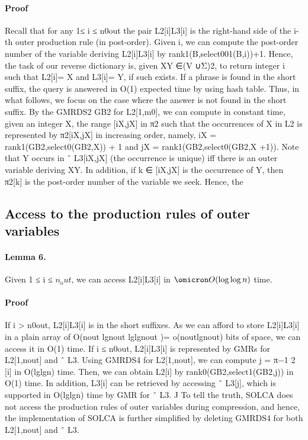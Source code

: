 \documentclass[a4paper,portrait,10pt,onecolumn]{article}
\begin{document}
			\paragraph{Proof}
				Recall that for any 1≤ i ≤ n0out the pair L2[i]L3[i] is the right-hand side of the i-th outer production rule (in post-order). Given i, we can compute the post-order number of the variable deriving L2[i]L3[i] by rank1(B,select001(B,i))+1. Hence, the task of our reverse dictionary is, given XY ∈(V ∪Σ)2, to return integer i such that L2[i]= X and L3[i]= Y, if such exists. If a phrase is found in the short suﬃx, the query is answered in O(1) expected time by using hash table. Thus, in what follows, we focus on the case where the answer is not found in the short suﬃx. By the GMRDS2 GB2 for L2[1,m0], we can compute in constant time, given an integer X, the range [iX,jX] in π2 such that the occurrences of X in L2 is represented by π2[iX,jX] in increasing order, namely, iX = rank1(GB2,select0(GB2,X)) + 1 and jX = rank1(GB2,select0(GB2,X +1)). Note that Y occurs in ˆ L3[iX,jX] (the occurrence is unique) iﬀ there is an outer variable deriving XY. In addition, if k ∈ [iX,jX] is the occurrence of Y, then π2[k] is the post-order number of the variable we seek. Hence, the
				
		\subsection{Access to the production rules of outer variables}
			\paragraph{Lemma 6.}   
				Given 1 ≤ i ≤ $n_out$, we can access L2[i]L3[i] in $\omicron O(\log \log n)$ time.
			\paragraph{Proof}
				 If i > n0out, L2[i]L3[i] is in the short suﬃxes. As we can aﬀord to store L2[i]L3[i] in a plain array of O(nout lgnout lglgnout )= o(noutlgnout) bits of space, we can access it in O(1) time. If i ≤ n0out, L2[i]L3[i] is represented by GMRs for L2[1,nout] and ˆ L3. Using GMRDS4 for L2[1,nout], we can compute j = π−1 2 [i] in O(lglgn) time. Then, we can obtain L2[i] by rank0(GB2,select1(GB2,j)) in O(1) time. In addition, L3[i] can be retrieved by accessing ˆ L3[j], which is supported in O(lglgn) time by GMR for ˆ L3. J To tell the truth, SOLCA does not access the production rules of outer variables during compression, and hence, the implementation of SOLCA is further simpliﬁed by deleting GMRDS4 for both L2[1,nout] and ˆ L3.
\end{document}
